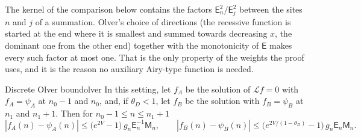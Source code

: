 The kernel of the comparison below contains the factors $\mathsf E_n^2/\mathsf E_j^2$ between the
sites $n$ and $j$ of a summation. Olver's choice of directions (the recessive function is started at
the end where it is smallest and summed towards decreasing $x$, the dominant one from the other end)
together with the monotonicity of $\mathsf E$ makes every such factor at most one. That is the only
property of the weights the proof uses, and it is the reason no auxiliary Airy-type function is needed.

\begin{theorem}{Discrete Olver bound}{olver}
In this setting, let $f_A$ be the solution of $\mathcal Lf=0$ with $f_A=\psi_A$ at $n_0-1$ and
$n_0$, and, if $\theta_D<1$, let $f_B$ be the solution with $f_B=\psi_B$ at $n_1$ and $n_1+1$.
Then for $n_0-1\le n\le n_1+1$
\[
  |f_A(n)-\psi_A(n)|\le\bigl(e^{2V}-1\bigr)\,g_n\mathsf E_n^{-1}\mathsf M_n,\qquad
  |f_B(n)-\psi_B(n)|\le\bigl(e^{2V/(1-\theta_D)}-1\bigr)\,g_n\mathsf E_n\mathsf M_n .
\]
\end{theorem}

